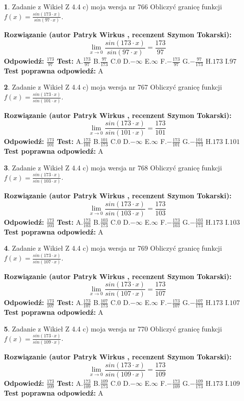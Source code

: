 \documentclass[12pt, a4paper]{article}
\theoremstyle{definition} %
\newtheorem{zad}{}
\newcommand{\zadStart}[1]{\begin{zad}#1\newline}
\newcommand{\zadStop}{\end{zad}}
\newcommand{\rozwStart}[2]{\noindent \textbf{Rozwiązanie (autor #1 , recenzent #2): }\newline}
\newcommand{\rozwStop}{\newline}
\newcommand{\odpStart}{\noindent \textbf{Odpowiedź:}\newline}
\newcommand{\odpStop}{\newline}
\newcommand{\testStart}{\noindent \textbf{Test:}\newline}
\newcommand{\testStop}{\newline}
\newcommand{\kluczStart}{\noindent \textbf{Test poprawna odpowiedź:}\newline}
\newcommand{\kluczStop}{\newline}
\begin{document}
\zadStart{Zadanie z Wikieł Z 4.4 c) moja wersja nr 766}
Obliczyć granicę funkcji $f(x)=\frac{sin(173\cdot x)}{sin(97\cdot x)}$.
\zadStop
\rozwStart{Patryk Wirkus}{Szymon Tokarski}
$$\lim\limits_{x\to 0}\frac{sin(173\cdot x)}{sin(97\cdot x)}=
\frac{173}{97}$$
\rozwStop
\odpStart
$\frac{173}{97}$
\odpStop
\testStart
A.$\frac{173}{97}$
B.$\frac{97}{173}$
C.$0$
D.$-\infty$
E.$\infty$
F.$-\frac{173}{97}$
G.$-\frac{97}{173}$
H.$173$
I.$97$
\testStop
\kluczStart
A
\kluczStop



\zadStart{Zadanie z Wikieł Z 4.4 c) moja wersja nr 767}
Obliczyć granicę funkcji $f(x)=\frac{sin(173\cdot x)}{sin(101\cdot x)}$.
\zadStop
\rozwStart{Patryk Wirkus}{Szymon Tokarski}
$$\lim\limits_{x\to 0}\frac{sin(173\cdot x)}{sin(101\cdot x)}=
\frac{173}{101}$$
\rozwStop
\odpStart
$\frac{173}{101}$
\odpStop
\testStart
A.$\frac{173}{101}$
B.$\frac{101}{173}$
C.$0$
D.$-\infty$
E.$\infty$
F.$-\frac{173}{101}$
G.$-\frac{101}{173}$
H.$173$
I.$101$
\testStop
\kluczStart
A
\kluczStop



\zadStart{Zadanie z Wikieł Z 4.4 c) moja wersja nr 768}
Obliczyć granicę funkcji $f(x)=\frac{sin(173\cdot x)}{sin(103\cdot x)}$.
\zadStop
\rozwStart{Patryk Wirkus}{Szymon Tokarski}
$$\lim\limits_{x\to 0}\frac{sin(173\cdot x)}{sin(103\cdot x)}=
\frac{173}{103}$$
\rozwStop
\odpStart
$\frac{173}{103}$
\odpStop
\testStart
A.$\frac{173}{103}$
B.$\frac{103}{173}$
C.$0$
D.$-\infty$
E.$\infty$
F.$-\frac{173}{103}$
G.$-\frac{103}{173}$
H.$173$
I.$103$
\testStop
\kluczStart
A
\kluczStop



\zadStart{Zadanie z Wikieł Z 4.4 c) moja wersja nr 769}
Obliczyć granicę funkcji $f(x)=\frac{sin(173\cdot x)}{sin(107\cdot x)}$.
\zadStop
\rozwStart{Patryk Wirkus}{Szymon Tokarski}
$$\lim\limits_{x\to 0}\frac{sin(173\cdot x)}{sin(107\cdot x)}=
\frac{173}{107}$$
\rozwStop
\odpStart
$\frac{173}{107}$
\odpStop
\testStart
A.$\frac{173}{107}$
B.$\frac{107}{173}$
C.$0$
D.$-\infty$
E.$\infty$
F.$-\frac{173}{107}$
G.$-\frac{107}{173}$
H.$173$
I.$107$
\testStop
\kluczStart
A
\kluczStop



\zadStart{Zadanie z Wikieł Z 4.4 c) moja wersja nr 770}
Obliczyć granicę funkcji $f(x)=\frac{sin(173\cdot x)}{sin(109\cdot x)}$.
\zadStop
\rozwStart{Patryk Wirkus}{Szymon Tokarski}
$$\lim\limits_{x\to 0}\frac{sin(173\cdot x)}{sin(109\cdot x)}=
\frac{173}{109}$$
\rozwStop
\odpStart
$\frac{173}{109}$
\odpStop
\testStart
A.$\frac{173}{109}$
B.$\frac{109}{173}$
C.$0$
D.$-\infty$
E.$\infty$
F.$-\frac{173}{109}$
G.$-\frac{109}{173}$
H.$173$
I.$109$
\testStop
\kluczStart
A
\kluczStop
\end{document}
